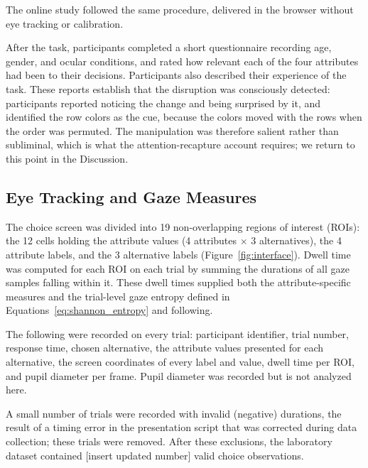 \documentclass[man,natbib,floatsintext]{apa7}
\begin{document}
The online study followed the same procedure, delivered in the browser without eye tracking or calibration.

After the task, participants completed a short questionnaire recording age, gender, and ocular conditions, and rated how relevant each of the four attributes had been to their decisions. Participants also described their experience of the task. These reports establish that the disruption was consciously detected: participants reported noticing the change and being surprised by it, and identified the row colors as the cue, because the colors moved with the rows when the order was permuted. The manipulation was therefore salient rather than subliminal, which is what the attention-recapture account requires; we return to this point in the Discussion.

\subsection{Eye Tracking and Gaze Measures}

The choice screen was divided into 19 non-overlapping regions of interest (ROIs): the 12 cells holding the attribute values (4 attributes $\times$ 3 alternatives), the 4 attribute labels, and the 3 alternative labels (Figure~\ref{fig:interface}). Dwell time was computed for each ROI on each trial by summing the durations of all gaze samples falling within it. These dwell times supplied both the attribute-specific measures and the trial-level gaze entropy defined in Equations~\ref{eq:shannon_entropy} and following.

The following were recorded on every trial: participant identifier, trial number, response time, chosen alternative, the attribute values presented for each alternative, the screen coordinates of every label and value, dwell time per ROI, and pupil diameter per frame. Pupil diameter was recorded but is not analyzed here.

A small number of trials were recorded with invalid (negative) durations, the result of a timing error in the presentation script that was corrected during data collection; these trials were removed.
After these exclusions, the laboratory dataset contained [insert updated number] valid choice observations.
\end{document}
